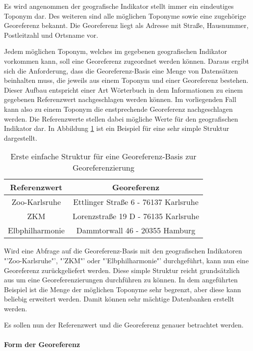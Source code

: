 			Es wird angenommen der geografische Indikator stellt immer ein eindeutiges Toponym dar.
			Des weiteren sind alle möglichen Toponyme sowie eine zugehörige Georeferenz bekannt. 
			Die Georeferenz liegt als Adresse mit Straße, Hausnummer, Postleitzahl und Ortsname vor.

			Jedem möglichen Toponym, welches im gegebenen geografischen Indikator vorkommen kann, soll eine Georeferenz zugeordnet werden können. 
			Daraus ergibt sich die Anforderung, dass die Georeferenz-Basis eine Menge von Datensätzen beinhalten muss, die jeweils aus einem Toponym und einer Georeferenz bestehen.
			Dieser Aufbau entspricht einer Art Wörterbuch in dem Informationen zu einem gegebenen Referenzwert nachgeschlagen werden können.
			Im vorliegenden Fall kann also zu einem Toponym die enstprechende Georeferenz nachgeschlagen werden.
			Die Referenzwerte stellen dabei mögliche Werte für den geografischen Indikator dar. 
			In Abbildung \ref{tab:simpleStruktur} ist ein Beispiel für eine sehr simple Struktur dargestellt.

			\begin{table}[htpb]
					\caption{Erste einfache Struktur für eine Georeferenz-Basis zur Georeferenzierung} 
					\centering
					\begin{tabular}{|c|c|}
						\hline
						Referenzwert & Georeferenz \\
						\hline\hline
						Zoo-Karlsruhe & Ettlinger Straße 6 - 76137 Karlsruhe \\
						\hline
						ZKM & Lorenzstraße 19 D - 76135 Karlsruhe \\
						\hline
						Elbphilharmonie & Dammtorwall 46 - 20355 Hamburg \\
						\hline
					\end{tabular}
					\label{tab:simpleStruktur} 
			\end{table} 

			Wird eine Abfrage auf die Georeferenz-Basis mit den geografischen Indikatoren "'Zoo-Karlsruhe"', "'ZKM"' oder "'Elbphilharmonie"' durchgeführt, kann nun eine Georeferenz zurückgeliefert werden.
			Diese simple Struktur reicht grundsätzlich aus um eine Georeferenzierungen durchführen zu können.
			In dem angeführten Beispiel ist die Menge der möglichen Toponyme sehr begrenzt, aber diese kann beliebig erweitert werden.
			Damit können sehr mächtige Datenbanken erstellt werden.

			Es sollen nun der Referenzwert und die Georeferenz genauer betrachtet werden.

			\paragraph{Form der Georeferenz}

